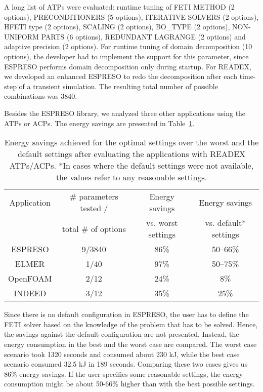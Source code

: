 A long list of ATPs were evaluated: runtime tuning of FETI METHOD (2 options), PRECONDITIONERS (5 options), ITERATIVE SOLVERS (2 options), HFETI type (2 options), SCALING (2 options), BO\_TYPE (2 options), NON-UNIFORM PARTS (6 options), REDUNDANT LAGRANGE (2 options) and adaptive precision (2 options). For runtime tuning of domain decomposition (10 options), the developer had to implement the support for this parameter, since ESPRESO performs domain decomposition only during startup. For READEX, we developed an enhanced ESPRESO to redo the decomposition after each time-step of a transient simulation. The resulting total number of possible combinations was 3840.

Besides the ESPRESO library, we analyzed three other applications using the ATPs or ACPs. The energy savings are presented in Table~\ref{tab:ATPACP}.

\begin{table}[h]
    \centering

    \begin{tabular}{|c|c|c|c|}
    \hline
Application & \# parameters tested /& Energy savings     & Energy savings \\
            & total \# of options      & vs. worst settings & vs. default* settings\\
\hline
ESPRESO     & 9/3840 & 86\% & 50--66\% \\ \hline
ELMER       & 1/40   & 97\% & 50--75\% \\ \hline
OpenFOAM    & 2/12   & 24\% &      8\% \\ \hline
INDEED      & 3/12   & 35\% &     25\% \\ \hline

    \end{tabular}
    \caption{Energy savings achieved for the optimal settings over the worst and the default settings after evaluating the  applications with READEX ATPs/ACPs. *In cases where the default settings were not available, the values refer to any reasonable settings.}
    \label{tab:ATPACP}
\end{table}

Since there is no default configuration in ESPRESO, the user has to define the FETI solver based on the knowledge of the problem that has to be solved. Hence, the savings against the default configuration are not presented. Instead, the energy consumption in the best and the worst case are compared. The worst case scenario took 1320 seconds and consumed about 230 kJ, while the best case scenario consumed 32.5 kJ in 189 seconds. Comparing these two cases gives us 86\% energy savings. If the user specifies some reasonable settings, the energy consumption might be about 50-66\% higher than with the best possible settings.
